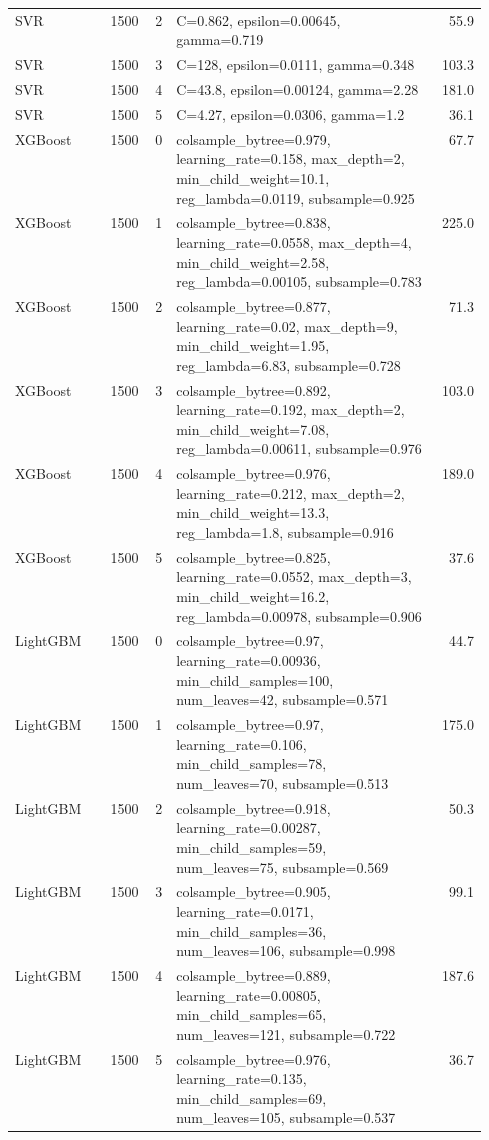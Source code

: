 \begin{longtable}{lrrp{0.55\linewidth}r}
SVR & 1500 & 2 & C=0.862, epsilon=0.00645, gamma=0.719 & 55.9 \\
SVR & 1500 & 3 & C=128, epsilon=0.0111, gamma=0.348 & 103.3 \\
SVR & 1500 & 4 & C=43.8, epsilon=0.00124, gamma=2.28 & 181.0 \\
SVR & 1500 & 5 & C=4.27, epsilon=0.0306, gamma=1.2 & 36.1 \\
XGBoost & 1500 & 0 & colsample\_bytree=0.979, learning\_rate=0.158, max\_depth=2, min\_child\_weight=10.1, reg\_lambda=0.0119, subsample=0.925 & 67.7 \\
XGBoost & 1500 & 1 & colsample\_bytree=0.838, learning\_rate=0.0558, max\_depth=4, min\_child\_weight=2.58, reg\_lambda=0.00105, subsample=0.783 & 225.0 \\
XGBoost & 1500 & 2 & colsample\_bytree=0.877, learning\_rate=0.02, max\_depth=9, min\_child\_weight=1.95, reg\_lambda=6.83, subsample=0.728 & 71.3 \\
XGBoost & 1500 & 3 & colsample\_bytree=0.892, learning\_rate=0.192, max\_depth=2, min\_child\_weight=7.08, reg\_lambda=0.00611, subsample=0.976 & 103.0 \\
XGBoost & 1500 & 4 & colsample\_bytree=0.976, learning\_rate=0.212, max\_depth=2, min\_child\_weight=13.3, reg\_lambda=1.8, subsample=0.916 & 189.0 \\
XGBoost & 1500 & 5 & colsample\_bytree=0.825, learning\_rate=0.0552, max\_depth=3, min\_child\_weight=16.2, reg\_lambda=0.00978, subsample=0.906 & 37.6 \\
LightGBM & 1500 & 0 & colsample\_bytree=0.97, learning\_rate=0.00936, min\_child\_samples=100, num\_leaves=42, subsample=0.571 & 44.7 \\
LightGBM & 1500 & 1 & colsample\_bytree=0.97, learning\_rate=0.106, min\_child\_samples=78, num\_leaves=70, subsample=0.513 & 175.0 \\
LightGBM & 1500 & 2 & colsample\_bytree=0.918, learning\_rate=0.00287, min\_child\_samples=59, num\_leaves=75, subsample=0.569 & 50.3 \\
LightGBM & 1500 & 3 & colsample\_bytree=0.905, learning\_rate=0.0171, min\_child\_samples=36, num\_leaves=106, subsample=0.998 & 99.1 \\
LightGBM & 1500 & 4 & colsample\_bytree=0.889, learning\_rate=0.00805, min\_child\_samples=65, num\_leaves=121, subsample=0.722 & 187.6 \\
LightGBM & 1500 & 5 & colsample\_bytree=0.976, learning\_rate=0.135, min\_child\_samples=69, num\_leaves=105, subsample=0.537 & 36.7 \\

\end{longtable}
